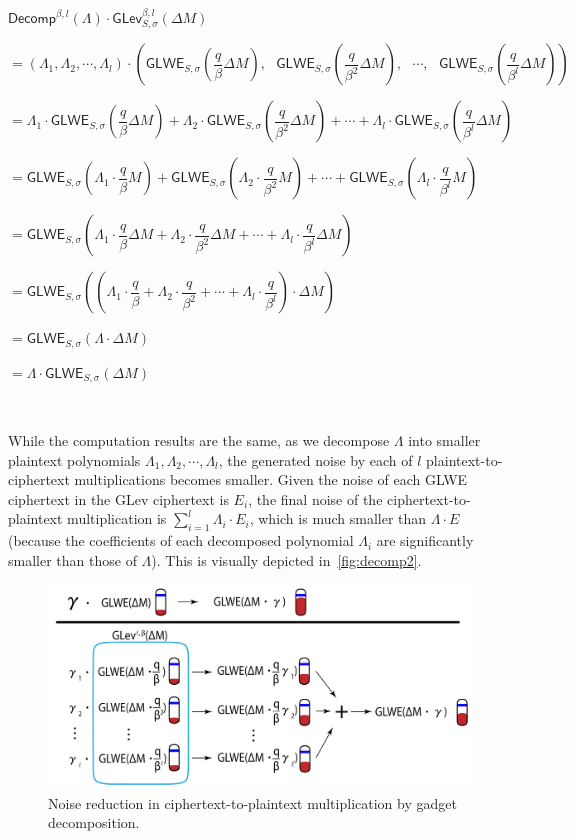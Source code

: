 $\textsf{Decomp}^{\beta, l}(\Lambda) \cdot \textsf{GLev}_{S, \sigma}^{\beta, l}(\Delta M)$

$= (\Lambda_1, \Lambda_2, \cdots, \Lambda_l) \cdot \left (\textsf{GLWE}_{S, \sigma}\left(\dfrac{q}{\beta} \Delta M\right), \text{ } \textsf{GLWE}_{S, \sigma}\left(\dfrac{q}{\beta^2} \Delta M\right), \text{ } \cdots, \text{ } \textsf{GLWE}_{S, \sigma}\left(\dfrac{q}{\beta^l} \Delta M\right) \right )$

$= \Lambda_1\cdot\textsf{GLWE}_{S, \sigma}\left(\dfrac{q}{\beta} \Delta M\right) +  \Lambda_2\cdot\textsf{GLWE}_{S, \sigma}\left(\dfrac{q}{\beta^2} \Delta M\right) + \cdots + \Lambda_l\cdot\textsf{GLWE}_{S, \sigma}\left(\dfrac{q}{\beta^l} \Delta M\right)$

$= \textsf{GLWE}_{S, \sigma}\left(\Lambda_1\cdot\dfrac{q}{\beta} M\right) +\textsf{GLWE}_{S, \sigma}\left(\Lambda_2\cdot\dfrac{q}{\beta^2} M\right)+ \cdots + \textsf{GLWE}_{S, \sigma}\left(\Lambda_l\cdot\dfrac{q}{\beta^l} M\right)$

$= \textsf{GLWE}_{S, \sigma}\left(\Lambda_1\cdot\dfrac{q}{\beta} \Delta M + \Lambda_2\cdot\dfrac{q}{\beta^2} \Delta M + \cdots + \Lambda_l\cdot\dfrac{q}{\beta^l} \Delta M\right)$

$= \textsf{GLWE}_{S, \sigma}\left(\left(\Lambda_1\cdot\dfrac{q}{\beta} + \Lambda_2\cdot\dfrac{q}{\beta^2} + \cdots + \Lambda_l\cdot\dfrac{q}{\beta^l}\right)\cdot \Delta M\right)$

$= \textsf{GLWE}_{S, \sigma}\left(\Lambda \cdot \Delta M\right)$

$= \Lambda \cdot \textsf{GLWE}_{S, \sigma}( \Delta M)$

$ $

While the computation results are the same, as we decompose $\Lambda$ into smaller plaintext polynomials $\Lambda_1, \Lambda_2, \cdots, \Lambda_l$, the generated noise by each of $l$ plaintext-to-ciphertext multiplications becomes smaller.  Given the noise of each GLWE ciphertext in the GLev ciphertext is $E_i$, the final noise of the ciphertext-to-plaintext multiplication is $\sum\limits_{i=1}^{l}\Lambda_i\cdot E_i$, which is much smaller than $\Lambda \cdot E$ (because the coefficients of each decomposed polynomial $\Lambda_i$ are significantly smaller than those of $\Lambda$). This is visually depicted in~\autoref{fig:decomp2}.

\begin{figure}[h!]
    \centering
  \includegraphics[width=0.8\linewidth]{figures/decomp2.pdf}
  \caption{Noise reduction in ciphertext-to-plaintext multiplication by gadget decomposition.}
  \label{fig:decomp2}
\end{figure}

